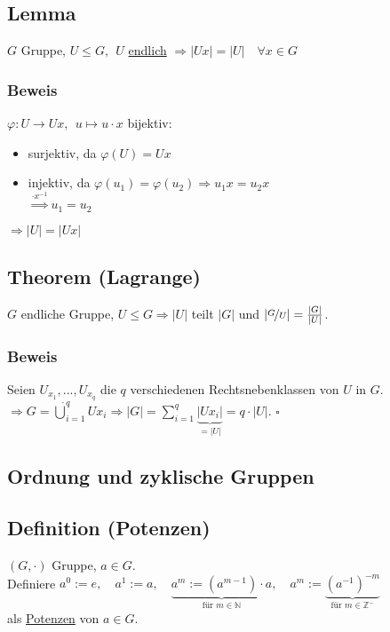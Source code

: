 \documentclass[a4paper, 12pt,titlepage, pdf, headsepline]{scrartcl}
\newcommand{\f}[2]{\nicefrac{#1}{#2}}
\newcommand{\uline}[1]{\underline{#1}}
\renewcommand{\>}{\rightarrow}
\renewcommand{\*}{\cdot}
\renewcommand{\phi}{\varphi}
\begin{document}
	      \subsection{Lemma}
	      $G$ Gruppe, $U \leq G,~~ U$ \uline{endlich} $\Rightarrow |Ux| = |U|\quad \forall x \in G$
	      \subsubsection*{Beweis}
	      $\phi: U \rightarrow Ux,~~ u \mapsto u \cdot x$ bijektiv:
	      \begin{itemize}
	      	\item surjektiv, da $\phi(U) = Ux$
	      	\item injektiv, da $\phi(u_1) = \phi(u_2) \Rightarrow u_1x = u_2x$\\
	      	      \noindent\hspace*{44.5mm}$\overset{\cdot x^{-1}}{\Rightarrow} u_1 = u_2$
	      \end{itemize}
	      $ \Rightarrow |U| = |Ux|$
	      \subsection{Theorem (Lagrange)}
	      $G$ endliche Gruppe, $U \leq G \Rightarrow |U|$ teilt $|G|$ und $| \f{G}{U} | = \frac{|G|}{|U|}$.
	      \subsubsection*{Beweis} Seien $U_{x_1},..., U_{x_q}$ die $q$ verschiedenen Rechtsnebenklassen von $U$ in $G$. \\
	      $\Rightarrow G = \dot{\bigcup}^q_{i=1} Ux_i \Rightarrow |G| =  \sum_{i = 1}^{q}  \underbrace{|Ux_i|}_{=|U|} = q \cdot |U|.$
	      \hfill$\square$
	      \subsection*{Ordnung und zyklische Gruppen}
	      \subsection{Definition (Potenzen)}
	      $(G, \cdot )$ Gruppe, $a \in G$.\\ Definiere $a^0 := e,\quad a^1 := a,\quad \underbrace{a^m := (a^{m-1}) \cdot a}_{\textrm{für }m \in \mathds{N}},\quad a^m := \underbrace{ (a^{-1})^{-m}}_{\textrm{für }m \in \mathds{Z}^-}$\\
	      als \uline{Potenzen} von $a \in G$.
\end{document}
